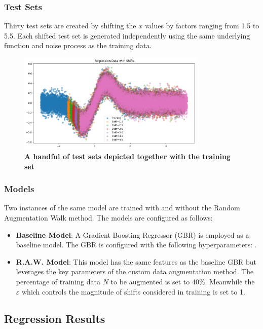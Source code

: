 \subsubsection{Test Sets}
Thirty test sets are created by shifting the $x$ values by factors ranging from 1.5 to 5.5. Each shifted test set is generated independently using the same underlying function and noise process as the training data.
\begin{figure}[H]
    \centering
    \includegraphics[width=0.8\textwidth]{assets/reg_shift_plot.png} 
    \caption{\textbf{A handful of test sets depicted together with the training set}}
    \label{fig:reg-shift-plot}
\end{figure}

\subsubsection{Models}
Two instances of the same model are trained with and without the Random Augmentation Walk method. The models are configured as follows:
\begin{itemize}
    \item \textbf{Baseline Model}: A Gradient Boosting Regressor (GBR) is employed as a baseline model. The GBR is configured with the following hyperparameters: .
    \item \textbf{R.A.W. Model}: This model has the same features as the baseline GBR but leverages the key parameters of the custom data augmentation method. The percentage of training data $N$ to be augmented is set to 40\%. Meanwhile the $\varepsilon$ which controls the magnitude of shifts considered in training is set to 1.
\end{itemize}


\subsection{Regression Results}

